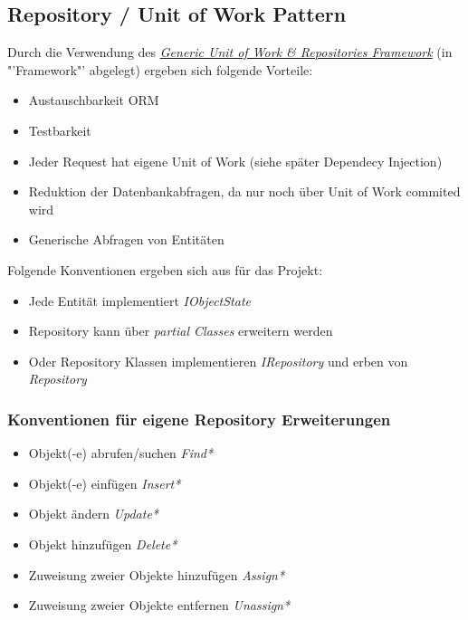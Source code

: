 	\subsection{Repository / Unit of Work Pattern}
		Durch die Verwendung des \href{https://genericunitofworkandrepositories.codeplex.com/}{\textit{Generic Unit of Work \& Repositories Framework}} (in "'Framework"' abgelegt) ergeben sich folgende Vorteile:
		\\\begin{itemize}	
			\item Austauschbarkeit ORM
			\item Testbarkeit
			\item Jeder Request hat eigene Unit of Work (siehe später Dependecy Injection)
			\item Reduktion der Datenbankabfragen, da nur noch über Unit of Work commited wird
			\item Generische Abfragen von Entitäten
		\end{itemize}
		Folgende Konventionen ergeben sich aus für das Projekt:
		\\\begin{itemize}
			\item Jede Entität implementiert \textit{IObjectState}
			\item Repository kann über \textit{partial Classes} erweitern werden
			\item Oder Repository Klassen implementieren \textit{IRepository} und erben von \textit{Repository}
		\end{itemize}

	\subsubsection{Konventionen für eigene Repository Erweiterungen}
		\begin{itemize}
			\item Objekt(-e) abrufen/suchen \textit{Find*}
			\item Objekt(-e) einfügen \textit{Insert*}
			\item Objekt ändern \textit{Update*}
			\item Objekt hinzufügen \textit{Delete*}
			\item Zuweisung zweier Objekte hinzufügen \textit{Assign*}
			\item Zuweisung zweier Objekte entfernen \textit{Unassign*}
		\end{itemize}

